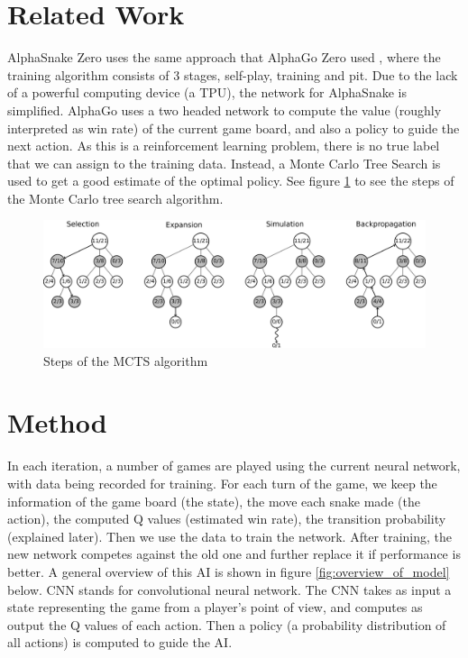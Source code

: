 \documentclass{article}
\begin{document}
\section{Related Work}

AlphaSnake Zero uses the same approach that AlphaGo Zero used
\cite{AlphaGoZeroPaper}, where the training algorithm consists of 3 stages,
self-play, training and pit. Due to the lack of a powerful computing device (a
TPU), the network for AlphaSnake is simplified. AlphaGo uses a two headed
network to compute the value (roughly interpreted as win rate) of the current
game board, and also a policy to guide the next action. As this is a
reinforcement learning problem, there is no true label that we can assign to the
training data. Instead, a Monte Carlo Tree Search is used to get a good
estimate of the optimal policy. See figure \ref{fig:mcts} to see the steps of
the Monte Carlo tree search algorithm.

\begin{figure}[!ht]
  \centering
  \includegraphics[width=12cm]{MCTS}
  \caption{Steps of the MCTS algorithm}
  \label{fig:mcts}
\end{figure}

\FloatBarrier

\section{Method}

In each iteration, a number of games are played using the current neural
network, with data being recorded for training. For each turn of the game, we
keep the information of the game board (the state), the move each snake made
(the action), the computed Q values (estimated win rate), the transition
probability (explained later). Then we use the data to train the network. After
training, the new network competes against the old one and further replace it if
performance is better. A general overview of this AI is shown in figure
\ref{fig:overview_of_model} below. CNN stands for convolutional neural network.
The CNN takes as input a state representing the game from a player's point of
view, and computes as output the Q values of each action. Then a policy (a
probability distribution of all actions) is computed to guide the AI.
\end{document}
